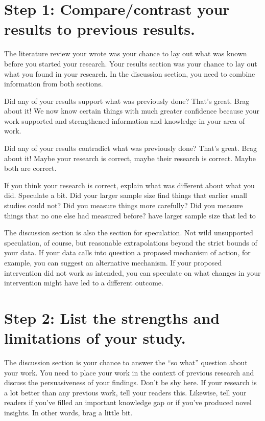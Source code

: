 \documentclass[
  letterpaper,
  DIV=11,
  numbers=noendperiod]{scrreprt}
\begin{document}
\section{Step 1: Compare/contrast your results to previous
results.}\label{step-1-comparecontrast-your-results-to-previous-results.}

The literature review your wrote was your chance to lay out what was
known before you started your research. Your results section was your
chance to lay out what you found in your research. In the discussion
section, you need to combine information from both sections.

Did any of your results support what was previously done? That's great.
Brag about it! We now know certain things with much greater confidence
because your work supported and strengthened information and knowledge
in your area of work.

Did any of your results contradict what was previously done? That's
great. Brag about it! Maybe your research is correct, maybe their
research is correct. Maybe both are correct.

If you think your research is correct, explain what was different about
what you did. Speculate a bit. Did your larger sample size find things
that earlier small studies could not? Did you measure things more
carefully? Did you measure things that no one else had measured before?
have larger sample size that led to

The discussion section is also the section for speculation. Not wild
unsupported speculation, of course, but reasonable extrapolations beyond
the strict bounds of your data. If your data calls into question a
proposed mechanism of action, for example, you can suggest an
alternative mechanism. If your proposed intervention did not work as
intended, you can speculate on what changes in your intervention might
have led to a different outcome.

\section{Step 2: List the strengths and limitations of your
study.}\label{step-2-list-the-strengths-and-limitations-of-your-study.}

The discussion section is your chance to answer the ``so what'' question
about your work. You need to place your work in the context of previous
research and discuss the persuasiveness of your findings. Don't be shy
here. If your research is a lot better than any previous work, tell your
readers this. Likewise, tell your readers if you've filled an important
knowledge gap or if you've produced novel insights. In other words, brag
a little bit.
\end{document}
